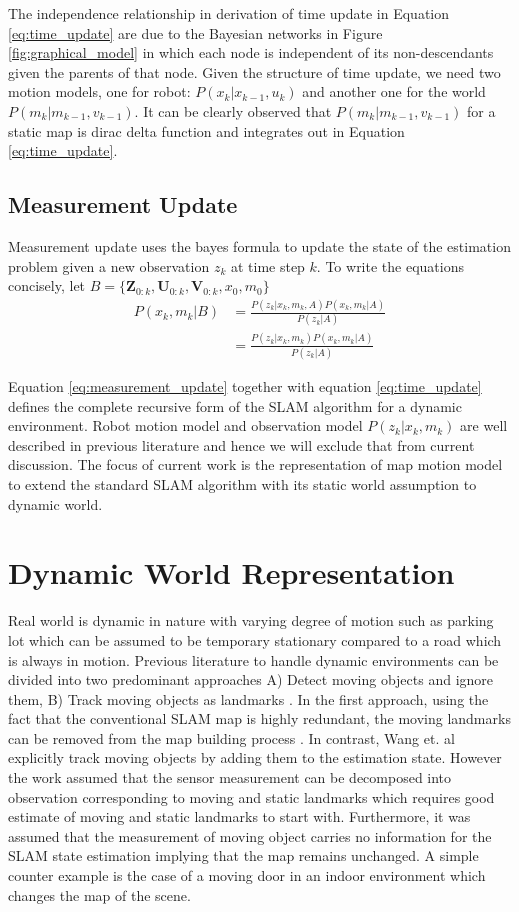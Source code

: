 \documentclass[conference]{IEEEtran}
\begin{document}
The independence relationship in derivation of time update in Equation \ref{eq:time_update} are due to the Bayesian networks in Figure \ref{fig:graphical_model} in which each node is independent of its non-descendants given the parents of that node. Given the structure of time update, we need two motion models, one for robot: $P(x_k|x_{k-1},u_k)$ and another one for the world $P(m_k|m_{k-1},v_{k-1})$. It can be clearly observed that $P(m_k|m_{k-1},v_{k-1})$ for a static map is dirac delta function and integrates out in Equation \ref{eq:time_update}. 

\subsection{Measurement Update} Measurement update uses the bayes formula to update the state of the estimation problem given a new observation $z_k$ at time step $k$. To write the equations concisely, let $B =\{ \mathbf{Z}_{0:k},\mathbf{U}_{0:k},\mathbf{V}_{0:k},x_0,m_0 \}$
 \begin{align}
P(x_k,m_k|B) &= \frac{P(z_k|x_k,m_k,A)P(x_k,m_k|A)}{P(z_k|A)} \nonumber\\
&=\frac{P(z_k|x_k,m_k)P(x_k,m_k|A)}{P(z_k|A)}
\label{eq:measurement_update}
\end{align}

Equation \ref{eq:measurement_update} together with equation \ref{eq:time_update} defines the complete recursive form of the SLAM algorithm for a dynamic environment. Robot motion model and observation model $P(z_k|x_k,m_k)$ are well described in previous literature and hence we will exclude that from current discussion. The focus of current work is the representation of map motion model to extend the standard SLAM algorithm with its static world assumption to dynamic world.

\section{Dynamic World Representation} Real world is dynamic in nature with varying degree of motion such as parking lot which can be assumed to be temporary stationary compared to a road which is always in motion. Previous literature to handle dynamic environments can be divided into two predominant approaches A) Detect moving objects and ignore them, B) Track moving objects as landmarks  \cite{bailey2006simultaneous}. In the first approach, using the fact that the conventional SLAM map is highly redundant, the moving landmarks can be removed from the map building process \cite{bailey2002mobile}. In contrast, Wang et. al \cite{wang2003online} explicitly track moving objects by adding them to the estimation state. However the work assumed that the sensor measurement can be decomposed into observation corresponding to moving and static landmarks which requires good estimate of moving and static landmarks to start with. Furthermore, it was assumed that the measurement of moving object carries no information for the SLAM state estimation implying that the map remains unchanged. A simple counter example is the case of a moving door in an indoor environment which changes the map of the scene.
\end{document}
